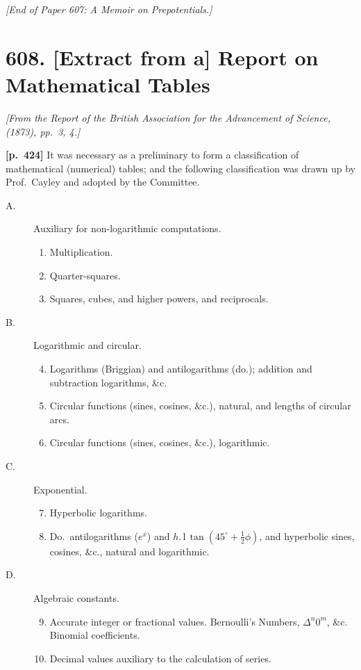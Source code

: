 \documentclass[11pt,a4paper]{article}
\begin{document}
\bigskip
\textit{[End of Paper 607: A Memoir on Prepotentials.]}

\bigskip
\section*{\textbf{608.} [Extract from a] Report on Mathematical Tables}

\noindent\textit{[From the Report of the British Association for the Advancement of Science, (1873), pp.~3, 4.]}

\bigskip
\noindent\textbf{[p.~424]}\quad
It was necessary as a preliminary to form a classification of mathematical (numerical) tables; and the following classification was drawn up by Prof.\ Cayley and adopted by the Committee.

\begin{description}
\item[A.] Auxiliary for non-logarithmic computations.
\begin{enumerate}
\item Multiplication.
\item Quarter-squares.
\item Squares, cubes, and higher powers, and reciprocals.
\end{enumerate}
\item[B.] Logarithmic and circular.
\begin{enumerate}\setcounter{enumi}{3}
\item Logarithms (Briggian) and antilogarithms (do.); addition and subtraction logarithms, \&c.
\item Circular functions (sines, cosines, \&c.), natural, and lengths of circular arcs.
\item Circular functions (sines, cosines, \&c.), logarithmic.
\end{enumerate}
\item[C.] Exponential.
\begin{enumerate}\setcounter{enumi}{6}
\item Hyperbolic logarithms.
\item Do.\ antilogarithms ($e^{x}$) and $h$.\,l\,$\tan(45^{\circ} + \tfrac{1}{2}\phi)$, and hyperbolic sines, cosines, \&c., natural and logarithmic.
\end{enumerate}
\item[D.] Algebraic constants.
\begin{enumerate}\setcounter{enumi}{8}
\item Accurate integer or fractional values. Bernoulli's Numbers, $\Delta^{n}0^{m}$, \&c. Binomial coefficients.
\item Decimal values auxiliary to the calculation of series.
\end{enumerate}
\end{description}
\end{document}
